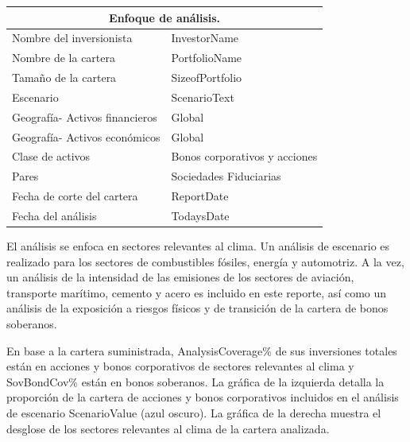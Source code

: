 \documentclass[10pt,table]{article}\usepackage[]{graphicx}\usepackage[]{color}
\begin{document}
\begin{multicols}{2}
		\begin{center}
			{
				\setlength{\tabcolsep}{10pt} %
				\renewcommand{\arraystretch}{1.5} %
				\begin{tabular}{ p{.35\linewidth} p{.49\linewidth} }
					\hline
					\multicolumn{2}{c}{\textbf{Enfoque de análisis.}} \\
					\hline
					Nombre del inversionista & InvestorName \\ 
					Nombre de la cartera & PortfolioName \\ 
					Tamaño de la cartera & SizeofPortfolio \\ 
					Escenario & ScenarioText \\ 
					Geografía- \newline Activos financieros & Global \\ 
					Geografía- \newline Activos económicos & Global \\ 
					Clase de activos & Bonos corporativos y acciones \\ 
					Pares & Sociedades Fiduciarias \\
					Fecha de corte del cartera & ReportDate \\ 
					Fecha del análisis & TodaysDate \\ 
					\hline
				\end{tabular}
			}
			
		\end{center}
		
		El análisis se enfoca en sectores relevantes al clima. Un análisis de escenario es realizado para los sectores de combustibles fósiles, energía y automotriz. A la vez, un análisis de la intensidad de las emisiones de los sectores de aviación, transporte marítimo, cemento y acero es incluido en este reporte, así como un análisis de la exposición a riesgos físicos y de transición de la cartera de bonos soberanos. 
		
		En base a la cartera suministrada, AnalysisCoverage\% de sus inversiones totales están en acciones y bonos corporativos de sectores relevantes al clima y SovBondCov\% están en bonos soberanos. La gráfica de la izquierda detalla la proporción de la cartera de acciones y bonos corporativos incluidos en el análisis de escenario ScenarioValue (azul oscuro). La gráfica de la derecha muestra el desglose de los sectores relevantes al clima de la cartera analizada.
		
		
		
		
		\vspace{0.8cm}
		
		
	\end{multicols}	
	
\end{document}

